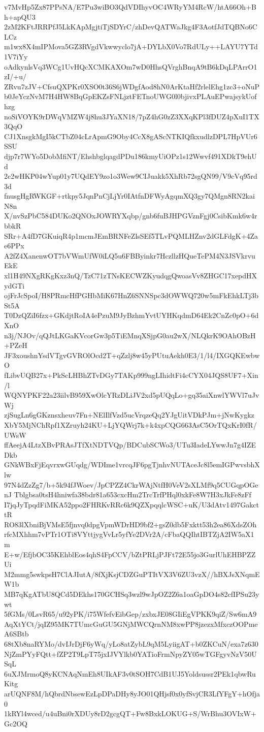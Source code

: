 v7MvHp5Zx87PPsNA/E7Pu3wiBO3QdVDIhyvOC4WRyYM4RcW/htA66Oh+Bh+apQU3
2zM2KFtJRRPfJ5LkKApMgjtiTjSDYrC/zhDevQATWaJkg4F3AotfJdTQBNo6CLCz
m1wx8X4mIPMova5GZ3RVgdVkwwyclo7jA+DYLbX0Vo7RdULy++LAYU7YTd1V7iYy
oAdkynlsVq3WCg1UvHQcXCMKAXOm7wD0HhsQVrghBnqA9tB6kDqLPArrO1zI/+u/
ZRvu7zJV+CfsuQXPKr0XSO0t36S6jWDgfAod8hN0ArKtaHf2rlelEhg1zc3+oNuP
b0JeYczNvM7H4HW8BqGpEKZsFNLjztFETnoUWG0l0bjivxPLAuEPwajsykUofhzg
noSiVOYK9rDWqVMZW4j8hu3JYaXN18/7pZ4hG0zZ3XXqKPl3fDUZ4pXuI1TX3QqO
CJ1XnsgkMgI5kCTbZ04cLrApmG9Oby4CcX8gAScNTKIQfkxudlzDPL7HpVUr6SSU
djp7r7WYo5DobMfiNT/EhshbglqagdPDu186kmyUiOPz1s12Wwvf491XDkT9ehUd
2c2wHKP04wYup01y7UQdEY9zo1o3Wew9CIJuakk5XhRb72sgQN99/V9cVq95rd3d
fnusgHgRWKGF+rtkpy5JqnPnCjLjYr0IAtfnDFWyAgqmXQ3gy7QMgn8RN2kaiN8n
X/nvSzPbC584DUKo2QNOxJOWRYXqbp/gnb6fuBJHPGVznFgj0CsibKmk6w4rbbkR
SRr+A4fD7GKuiqR4p1mcmJEmBRNFeZlsSEf5TLvPQMLHZnv2dGLFdgK+4Zae6PPx
A2fZ4XanenwOT7bVWmUfW0iLQ5u6FBByinkr7HczllzHQueTePM4N3JSVkrvuEkE
xl1H49NXgRKgKxz3nQ/TzC71zTNsKECWZKyudqgQwoasVv8ZHGC17xepdHXydGTi
ojFrJcSpoI/H8PRmcHfPGHbMiK67HnZ6SNNSpc3dOWWQ720w5mFkEhkLTj3bSt5A
T0DzQZiI6fzx+GKdjtRoIA4ePzuM9JyBzhmYvtUYHKqdmD64Ek2CnZc0pO+6dXnO
n3j/NJOv/qQJtLKGaKVcorGw3p5TiEMnqXSjpG0au2wX/NLQkrK9OAhOBzH+PZeH
JF3xoushnYsdVTgvGVROlOcd2T+qZzlj8w45yPUtuAekh0E3/1/l4/IXGQKEwbwO
fLibvUQB27x+PkScLHBhZTvDGy7TAKp999ngLIhidtFi4cCYX04JQS8UF7+Xin/l
WQNYPKF22a23iilvB959XwOlcYRzDLiJV2xd5pUQqLo+gq35aiXnwlYWVl7uJvWj
zjSugLn6gGKznsxheuv7Fn+NElIlfVzd5ucVrqzeQq2YJgUitVDkPJm+jNwKygkz
XbY5MjNChRpf1XZruyh24KU+LjYQWrj7k+k4xpCQG663AsC5OrTQxKrI0fR/UWsW
ffAeejA4LtzXBvPRAsJTfXtNDTVQp/BDCubSCWo3/UTu3IadeLYwwJn7g4IZEDkb
GNkWBxFjEqvrxwGUqdg/WDIme1vrcqJF6pgTjnhvNUTAceJc8l5emIGPwvsbhXlw
97N4dZzZg7/b+5k94fJWoev/JpCPZZ4CkrWAjNtfH0VeV2sXLMf9q5CUGqpOGenJ
Tblgbsa0tsH4hniwfa38bdr81a653cxcHm2TrcTrfPHql0xkFe8W7H3xJkFe8zFf
I7jqJyTpqdFiMKA52ppo2FHRKvRRc6k9QZXpqqlcWSC+uK/U3dAtv1497GakcttR
RO83lXbniBjVMsE5fjnvq0dpgVpmWDrHD9bf2+gsZ0db5Fxktt53h2ea86XdsZOh
rfcMXhhm7vPTr1OTi8VYttjygVvLr5yfYe2DVr2A/cFbaQQIhtIBTZjA2IW5aX1m
E+w/EfjbOC35KEhblEos4qhS4FpCCV/bZtPRLjPJFt72E55jo3GurlUhEHBPZZUi
M2mmg5swkpsH7ClAJIutA/8fXjKsjCDZGuPTItVX3V6ZU3vzX//hBXJsXNqmEW1b
MB7qKgATbU8QCd5DEkhs170GCHSq3wzl9wJpOZ2Z6a1oaGpDO4s82cfIPSu23ywt
5fGMs/0LsvR65/u92yPK/i75WfefvEibGep/zxbxJE08GIiEgVPKK9qiZ/Sw6mA9
AqXtYCt/jqIZ95MK7TUmcGuGU5GNjMWCQrnNM8xwPP8jzezxMfxczOOPmeA6SBtb
68tXb8naRYMo/dvIJrDjF6yWq/yLo8atZybL9qM5LyiigAT+b0ZKCuN/exa7z630
NjZmPYyFQtt+fZP2T9LpT75jxIJVYlkb0YATioFrmNpyZY05wTGFgyvNzV50USqL
6uXJMrmoQ8yKCNAqNmEh8UIkAF3v0tSOH7CdB1UJ5Yoldsussr2PEk1qbwRuKitg
arUQNF8M/hQbrdNbsewEzLpDPaDHy8yJO01QHjsf0x0yfSvjCR3LfYFgY+hOfja0
1kRYl4wced/u4uBni0rXDUy8rD2gcgQT+Fw8BxkLOKUG+S/WrBhu3OVIxW+Gc2OQ
